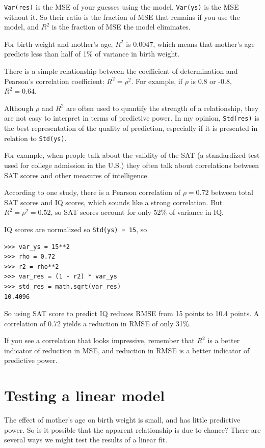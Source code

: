\documentclass[12pt]{book}
\begin{document}
{\tt Var(res)} is the MSE of your guesses using the model,
{\tt Var(ys)} is the MSE without it.   So their ratio is the fraction
of MSE that remains if you use the model, and $R^2$ is the fraction
of MSE the model eliminates.

For birth weight and mother's age, $R^2$ is 0.0047, which means
that mother's age predicts less than half of 1\% of variance in
birth weight.

There is a simple relationship between the coefficient of
determination and Pearson's correlation coefficient: $R^2 = \rho^2$.
For example, if $\rho$ is 0.8 or -0.8, $R^2 = 0.64$.

Although $\rho$ and $R^2$ are often used to quantify the strength of a
relationship, they are not easy to interpret in terms of predictive
power.  In my opinion, {\tt Std(res)} is the best representation
of the quality of prediction, especially if it is presented
in relation to {\tt Std(ys)}.

For example, when people talk about the validity of the SAT
(a standardized test used for college admission in the U.S.) they
often talk about correlations between SAT scores and other measures of
intelligence.

According to one study, there is a Pearson correlation of
$\rho=0.72$ between total SAT scores and IQ scores, which sounds like
a strong correlation.  But $R^2 = \rho^2 = 0.52$, so SAT scores
account for only 52\% of variance in IQ.

IQ scores are normalized so {\tt Std(ys) = 15}, so

\begin{verbatim}
>>> var_ys = 15**2
>>> rho = 0.72
>>> r2 = rho**2
>>> var_res = (1 - r2) * var_ys
>>> std_res = math.sqrt(var_res)
10.4096
\end{verbatim}

So using SAT score to predict IQ reduces RMSE from 15 points to 10.4
points.  A correlation of 0.72 yields a reduction in RMSE of only
31\%.

If you see a correlation that looks impressive, remember that $R^2$ is
a better indicator of reduction in MSE, and reduction in RMSE is a
better indicator of predictive power.


\section{Testing a linear model}

The effect of mother's age on birth weight is small, and has little
predictive power.  So is it possible that the apparent relationship
is due to chance?  There are several ways we might test the
results of a linear fit.
\end{document}
